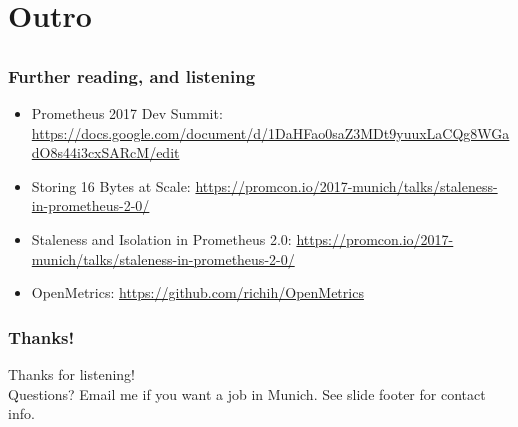 \documentclass[t]{beamer}
\begin{document}
\section{Outro}


\subsection{}


\begin{frame}
	\frametitle{Further reading, and listening}
	\begin{itemize}
		\item Prometheus 2017 Dev Summit: \url{https://docs.google.com/document/d/1DaHFao0saZ3MDt9yuuxLaCQg8WGadO8s44i3cxSARcM/edit}
		\item Storing 16 Bytes at Scale: \url{https://promcon.io/2017-munich/talks/staleness-in-prometheus-2-0/}
		\item Staleness and Isolation in Prometheus 2.0: \url{https://promcon.io/2017-munich/talks/staleness-in-prometheus-2-0/}
		\item OpenMetrics: \url{https://github.com/richih/OpenMetrics}
	\end{itemize}
\end{frame}


\begin{frame}
	\frametitle{Thanks!}
		\begin{center}
			\vfill
			Thanks for listening!\\
			\vfill
			Questions?
			\vfill
			Email me if you want a job in Munich.
			\vfill
			See slide footer for contact info.
			\vfill
		\end{center}
\end{frame}
\end{document}
